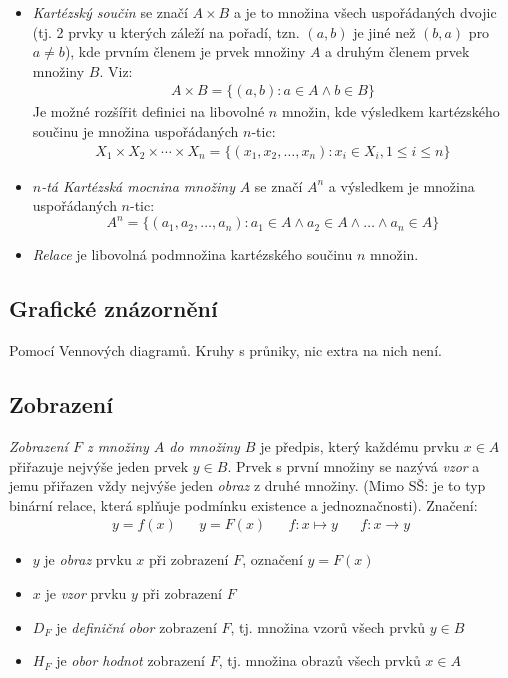\documentclass[12pt]{article}
\begin{document}
\begin{itemize}
\item \emph{Kartézský součin} se značí $A \times B$ a je to množina všech uspořádaných dvojic (tj. 2 prvky u kterých záleží na pořadí, tzn. $(a,b)$ je jiné než $(b, a)$ pro $a \neq b$), kde prvním členem je prvek množiny $A$ a druhým členem prvek množiny $B$. Viz:
\begin{align}
A \times B = \{ (a,b): a \in A \land b \in B \}
\end{align}
Je možné rozšířit definici na libovolné $n$ množin, kde výsledkem kartézského součinu je množina uspořádaných $n$-tic:
\begin{align}
 X_{1}\times X_{2}\times \dotsm \times X_{n}=\{(x_{1},x_{2},\dotsc ,x_{n}):x_{i}\in X_{i},1\leq i\leq n\}
\end{align}
\item \emph{$n$-tá Kartézská mocnina množiny} $A$ se značí $A^n$ a výsledkem je množina uspořádaných $n$-tic:
\begin{equation}
A^n = \{ \left(a_1, a_2, \dotsc, a_n \right): a_1 \in A \land a_2 \in A \land \dotso \land a_n \in A \}
\end{equation}
\item \emph{Relace} je libovolná podmnožina kartézského součinu $n$ množin.
\end{itemize}
\subsection{Grafické znázornění}
Pomocí Vennových diagramů. Kruhy s průniky, nic extra na nich není.
\subsection{Zobrazení}
\emph{Zobrazení $F$ z množiny $A$ do množiny $B$} je předpis, který každému prvku $ x \in A$ přiřazuje nejvýše jeden prvek $y \in B$. Prvek s první množiny se nazývá \emph{vzor} a jemu přiřazen vždy nejvýše jeden \emph{obraz} z druhé množiny. (Mimo SŠ: je to typ binární relace, která splňuje podmínku existence a jednoznačnosti). Značení:
\begin{align}
y = f(x) && y = F(x) && f: x \mapsto y && f: x \to y
\end{align}
\begin{itemize}
\item $y$ je \emph{obraz} prvku $x$ při zobrazení $F$, označení $y =F(x)$
\item $x$ je \emph{vzor} prvku $y$ při zobrazení $F$
\item $D_F$ je \emph{definiční obor} zobrazení $F$, tj. množina vzorů všech prvků $ y \in B$
\item $H_F$ je \emph{obor hodnot} zobrazení $F$, tj. množina obrazů všech prvků $ x \in A$
\end{itemize}
\end{document}
